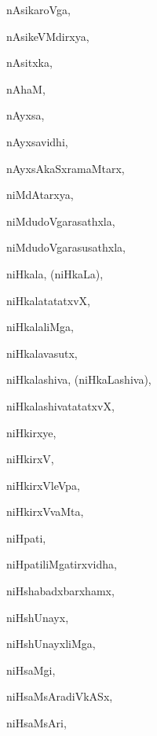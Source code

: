 \begin{multicols}{3}
{\noindent
{nAsikaroVga}, \pageref{nAsikaroVga}

\noindent
{nAsikeVMdirxya}, \pageref{nAsikeVMdirxya}

\noindent
{nAsitxka}, \pageref{nAsitxka}

\noindent
{nAhaM}, \pageref{nAhaM}

\noindent
{nAyxsa}, \pageref{nAyxsa}

\noindent
{nAyxsavidhi}, \pageref{nAyxsavidhi}

\noindent
{nAyxsAkaSxramaMtarx}, \pageref{nAyxsAkaSxramaMtarx}

\noindent
{niMdAtarxya}, \pageref{niMdAtarxya}

\noindent
{niMdudoVgarasathxla}, \pageref{niMdudoVgarasathxla}

\noindent
{niMdudoVgarasusathxla}, \pageref{niMdudoVgarasusathxla}

\noindent
{niHkala, (niHkaLa)}, \pageref{niHkala,niHkaLa}

\noindent
{niHkalatatatxvX}, \pageref{niHkalatatatxvX}

\noindent
{niHkalaliMga}, \pageref{niHkalaliMga}

\noindent
{niHkalavasutx}, \pageref{niHkalavasutx}

\noindent
{niHkalashiva, (niHkaLashiva)}, \pageref{niHkalashiva,niHkaLashiva}

\noindent
{niHkalashivatatatxvX}, \pageref{niHkalashivatatatxvX}

\noindent
{niHkirxye}, \pageref{niHkirxye}

\noindent
{niHkirxV}, \pageref{niHkirxV}

\noindent
{niHkirxVleVpa}, \pageref{niHkirxVleVpa}

\noindent
{niHkirxVvaMta}, \pageref{niHkirxVvaMta}

\noindent
{niHpati}, \pageref{niHpati}

\noindent
{niHpatiliMgatirxvidha}, \pageref{niHpatiliMgatirxvidha}

\noindent
{niHshabadxbarxhamx}, \pageref{niHshabadxbarxhamx}

\noindent
{niHshUnayx}, \pageref{niHshUnayx}

\noindent
{niHshUnayxliMga}, \pageref{niHshUnayxliMga}

\noindent
{niHsaMgi}, \pageref{niHsaMgi}

\noindent
{niHsaMsAradiVkASx}, \pageref{niHsaMsAradiVkASx}

\noindent
{niHsaMsAri}, \pageref{niHsaMsAri}

}
\end{multicols}
